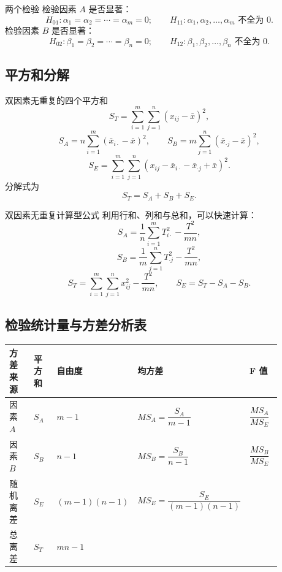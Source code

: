 \documentclass[UTF8,zihao=-4,fontset=fandol]{ctexart}
\begin{document}
\begin{keybox}{两个检验}
检验因素 $A$ 是否显著：
\[
H_{01}:\alpha_1=\alpha_2=\cdots=\alpha_m=0;
\qquad
H_{11}:\alpha_1,\alpha_2,\ldots,\alpha_m \text{ 不全为 }0.
\]
检验因素 $B$ 是否显著：
\[
H_{02}:\beta_1=\beta_2=\cdots=\beta_n=0;
\qquad
H_{12}:\beta_1,\beta_2,\ldots,\beta_n \text{ 不全为 }0.
\]
\end{keybox}

\subsection{平方和分解}

\begin{keybox}{双因素无重复的四个平方和}
\[
S_T=\sum_{i=1}^{m}\sum_{j=1}^{n}(x_{ij}-\bar{x})^2,
\]
\[
S_A=n\sum_{i=1}^{m}(\bar{x}_{i\cdot}-\bar{x})^2,
\qquad
S_B=m\sum_{j=1}^{n}(\bar{x}_{\cdot j}-\bar{x})^2,
\]
\[
S_E=\sum_{i=1}^{m}\sum_{j=1}^{n}
(x_{ij}-\bar{x}_{i\cdot}-\bar{x}_{\cdot j}+\bar{x})^2.
\]
分解式为
\[
S_T=S_A+S_B+S_E.
\]
\end{keybox}

\begin{methodbox}{双因素无重复计算型公式}
利用行和、列和与总和，可以快速计算：
\[
S_A=\frac{1}{n}\sum_{i=1}^{m}T_{i\cdot}^{2}-\frac{T^2}{mn},
\]
\[
S_B=\frac{1}{m}\sum_{j=1}^{n}T_{\cdot j}^{2}-\frac{T^2}{mn},
\]
\[
S_T=\sum_{i=1}^{m}\sum_{j=1}^{n}x_{ij}^{2}-\frac{T^2}{mn},
\qquad
S_E=S_T-S_A-S_B.
\]
\end{methodbox}

\subsection{检验统计量与方差分析表}

\begin{longtable}{@{}p{0.17\linewidth}p{0.13\linewidth}p{0.18\linewidth}p{0.25\linewidth}p{0.15\linewidth}@{}}
\toprule
\textbf{方差来源} & \textbf{平方和} & \textbf{自由度} & \textbf{均方差} & \textbf{F 值} \\
\midrule
因素 $A$ & $S_A$ & $m-1$ & $MS_A=\dfrac{S_A}{m-1}$ & $\dfrac{MS_A}{MS_E}$ \\
因素 $B$ & $S_B$ & $n-1$ & $MS_B=\dfrac{S_B}{n-1}$ & $\dfrac{MS_B}{MS_E}$ \\
随机离差 & $S_E$ & $(m-1)(n-1)$ & $MS_E=\dfrac{S_E}{(m-1)(n-1)}$ & \\
总离差 & $S_T$ & $mn-1$ & & \\
\bottomrule
\end{longtable}
\end{document}
